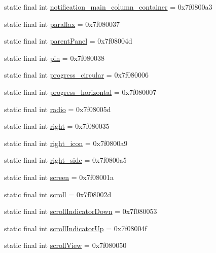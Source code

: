 \begin{CompactItemize}
static final int \hyperlink{classandroid_1_1support_1_1v4_1_1_r_1_1id_6405b5101e1c5b029a1216fc930e95ed}{notification\_\-main\_\-column\_\-container} = 0x7f0800a3
\item 
static final int \hyperlink{classandroid_1_1support_1_1v4_1_1_r_1_1id_e1dbe53f6434fa976a62df2234412b43}{parallax} = 0x7f080037
\item 
static final int \hyperlink{classandroid_1_1support_1_1v4_1_1_r_1_1id_e5c3d44c73862d69bf3231d420dbe935}{parentPanel} = 0x7f08004d
\item 
static final int \hyperlink{classandroid_1_1support_1_1v4_1_1_r_1_1id_96e2596366510e774ede5ee0e0db2455}{pin} = 0x7f080038
\item 
static final int \hyperlink{classandroid_1_1support_1_1v4_1_1_r_1_1id_a8f3df0e51806da55cb29d4066334af3}{progress\_\-circular} = 0x7f080006
\item 
static final int \hyperlink{classandroid_1_1support_1_1v4_1_1_r_1_1id_992b02c0497aae8f4efc804851658b8c}{progress\_\-horizontal} = 0x7f080007
\item 
static final int \hyperlink{classandroid_1_1support_1_1v4_1_1_r_1_1id_4684f6a7b99ef9380f470fca3aedec14}{radio} = 0x7f08005d
\item 
static final int \hyperlink{classandroid_1_1support_1_1v4_1_1_r_1_1id_c97f225c8ea89ee3d5760b2515fcfcdb}{right} = 0x7f080035
\item 
static final int \hyperlink{classandroid_1_1support_1_1v4_1_1_r_1_1id_fb9e2738e55ef731a757110ecd360209}{right\_\-icon} = 0x7f0800a9
\item 
static final int \hyperlink{classandroid_1_1support_1_1v4_1_1_r_1_1id_4fb604ab0f2917cb4b9b23273b8885f6}{right\_\-side} = 0x7f0800a5
\item 
static final int \hyperlink{classandroid_1_1support_1_1v4_1_1_r_1_1id_bf412abfd2174cf1fc73b3c3bf339699}{screen} = 0x7f08001a
\item 
static final int \hyperlink{classandroid_1_1support_1_1v4_1_1_r_1_1id_43abca5b98b20180f0a269934105252e}{scroll} = 0x7f08002d
\item 
static final int \hyperlink{classandroid_1_1support_1_1v4_1_1_r_1_1id_dcfeedade22463598ce06f4271b901b8}{scrollIndicatorDown} = 0x7f080053
\item 
static final int \hyperlink{classandroid_1_1support_1_1v4_1_1_r_1_1id_35657a60e9a119f938ad5331d0bca067}{scrollIndicatorUp} = 0x7f08004f
\item 
static final int \hyperlink{classandroid_1_1support_1_1v4_1_1_r_1_1id_97dde9a740e120103594e0a3ff07d4b2}{scrollView} = 0x7f080050

\end{CompactItemize}
